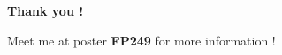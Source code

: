 \documentclass{beamer}
\begin{document}
\begin{frame}
	\vfill
	\begin{center}
		\large
		\textbf{Thank you !}
	\end{center}
	\vfill
	\begin{center}
	{Meet me at poster \textbf{FP249}} for more information !	
	\end{center}
\end{frame}
%
%
%
%
%
%
%
%
%
%
%
\end{document}
